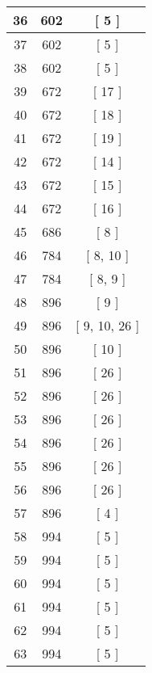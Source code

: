 \begin{center}
\begin{longtable}[H]{|| c c c ||}
36 & 602 & [ 5 ] \\ 
\hline
37 & 602 & [ 5 ] \\ 
\hline
38 & 602 & [ 5 ] \\ 
\hline
39 & 672 & [ 17 ] \\ 
\hline
40 & 672 & [ 18 ] \\ 
\hline
41 & 672 & [ 19 ] \\ 
\hline
42 & 672 & [ 14 ] \\ 
\hline
43 & 672 & [ 15 ] \\ 
\hline
44 & 672 & [ 16 ] \\ 
\hline
45 & 686 & [ 8 ] \\ 
\hline
46 & 784 & [ 8, 10 ] \\ 
\hline
47 & 784 & [ 8, 9 ] \\ 
\hline
48 & 896 & [ 9 ] \\ 
\hline
49 & 896 & [ 9, 10, 26 ] \\ 
\hline
50 & 896 & [ 10 ] \\ 
\hline
51 & 896 & [ 26 ] \\ 
\hline
52 & 896 & [ 26 ] \\ 
\hline
53 & 896 & [ 26 ] \\ 
\hline
54 & 896 & [ 26 ] \\ 
\hline
55 & 896 & [ 26 ] \\ 
\hline
56 & 896 & [ 26 ] \\ 
\hline
57 & 896 & [ 4 ] \\ 
\hline
58 & 994 & [ 5 ] \\ 
\hline
59 & 994 & [ 5 ] \\ 
\hline
60 & 994 & [ 5 ] \\ 
\hline
61 & 994 & [ 5 ] \\ 
\hline
62 & 994 & [ 5 ] \\ 
\hline
63 & 994 & [ 5 ] \\ 
\hline
\end{longtable}
\end{center}
